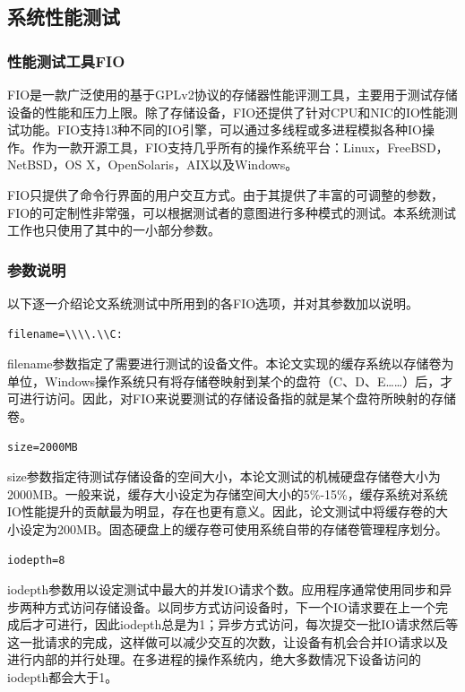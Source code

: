 \subsection{系统性能测试}

\subsubsection{性能测试工具FIO}
FIO是一款广泛使用的基于GPLv2协议的存储器性能评测工具，主要用于测试存储设备的性能和压力上限。除了存储设备，FIO还提供了针对CPU和NIC的IO性能测试功能。FIO支持13种不同的IO引擎，可以通过多线程或多进程模拟各种IO操作。作为一款开源工具，FIO支持几乎所有的操作系统平台：Linux，FreeBSD，NetBSD，OS X，OpenSolaris，AIX以及Windows。

FIO只提供了命令行界面的用户交互方式。由于其提供了丰富的可调整的参数，FIO的可定制性非常强，可以根据测试者的意图进行多种模式的测试。本系统测试工作也只使用了其中的一小部分参数。

\subsubsection{参数说明}

以下逐一介绍论文系统测试中所用到的各FIO选项，并对其参数加以说明。

\begin{lstlisting}
filename=\\\\.\\C:
\end{lstlisting}

filename参数指定了需要进行测试的设备文件。本论文实现的缓存系统以存储卷为单位，Windows操作系统只有将存储卷映射到某个的盘符（C、D、E……）后，才可进行访问。因此，对FIO来说要测试的存储设备指的就是某个盘符所映射的存储卷。

\begin{lstlisting}
size=2000MB
\end{lstlisting}

size参数指定待测试存储设备的空间大小，本论文测试的机械硬盘存储卷大小为2000MB。一般来说，缓存大小设定为存储空间大小的5\%-15\%，缓存系统对系统IO性能提升的贡献最为明显，存在也更有意义。因此，论文测试中将缓存卷的大小设定为200MB。固态硬盘上的缓存卷可使用系统自带的存储卷管理程序划分。

\begin{lstlisting}
iodepth=8
\end{lstlisting}

iodepth参数用以设定测试中最大的并发IO请求个数。应用程序通常使用同步和异步两种方式访问存储设备。以同步方式访问设备时，下一个IO请求要在上一个完成后才可进行，因此iodepth总是为1；异步方式访问，每次提交一批IO请求然后等这一批请求的完成，这样做可以减少交互的次数，让设备有机会合并IO请求以及进行内部的并行处理。在多进程的操作系统内，绝大多数情况下设备访问的iodepth都会大于1。

